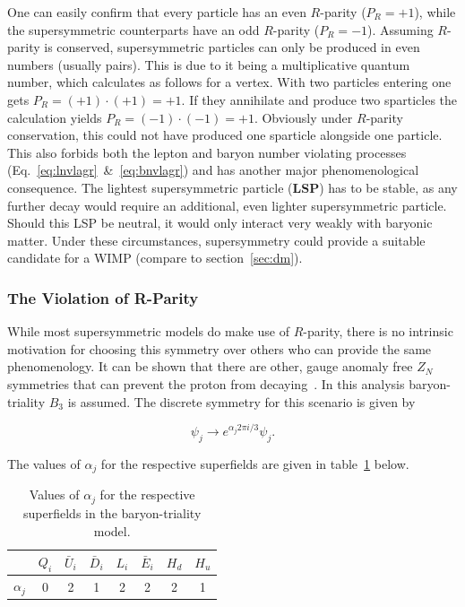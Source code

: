 \noindent One can easily confirm that every particle has an even $R$-parity ($P_R = +1$), while the supersymmetric counterparts have an odd $R$-parity ($P_R = -1$). Assuming $R$-parity is conserved, supersymmetric particles can only be produced in even numbers (usually pairs). This is due to it being a multiplicative quantum number, which calculates as follows for a vertex. With two particles entering one gets $P_R = (+1) \cdot (+1) = +1$. If they annihilate and produce two sparticles the calculation yields $P_R = (-1) \cdot (-1) = +1$. Obviously under $R$-parity conservation, this could not have produced one sparticle alongside one particle. This also forbids both the lepton and baryon number violating processes (Eq.~\ref{eq:lnvlagr}~\&~\ref{eq:bnvlagr}) and has another major phenomenological consequence. The lightest supersymmetric particle (\textbf{LSP}) has to be stable, as any further decay would require an additional, even lighter supersymmetric particle. Should this LSP be neutral, it would only interact very weakly with baryonic matter. Under these circumstances, supersymmetry could provide a suitable candidate for a WIMP (compare to section~\ref{sec:dm}).



\subsubsection{The Violation of R-Parity}
\label{sec:rparityvio}

While most supersymmetric models do make use of $R$-parity, there is no intrinsic motivation for choosing this symmetry over others who can provide the same phenomenology. It can be shown that there are other, gauge anomaly free $Z_N$ symmetries that can prevent the proton from decaying~\cite{b3p6}. In this analysis baryon-triality $B_3$ is assumed. The discrete symmetry for this scenario is given by~\cite{b3def}

\begin{equation}
  \label{eq:b3symmetry}
  \psi_j \rightarrow e^{\alpha_j 2\pi i/3} \psi_j.
\end{equation}

\noindent The values of $\alpha_j$ for the respective superfields are given in table~\ref{tab:alphaj} below.

\begin{table}[htb]
  \centering
  \begin{tabular}{|c|c|c|c|c|c|c|c|}
    \hline
    & $Q_i$ & $\bar{U}_i$ & $\bar{D}_i$ & $L_i$ & $\bar{E}_i$ & $H_d$ & $H_u$ \\ \hline
    $\alpha_j$ & 0 & 2 & 1 & 2 & 2 & 2 & 1 \\ \hline
  \end{tabular}
  \caption{Values of $\alpha_j$ for the respective superfields in the baryon-triality model.}
  \label{tab:alphaj}
\end{table}

